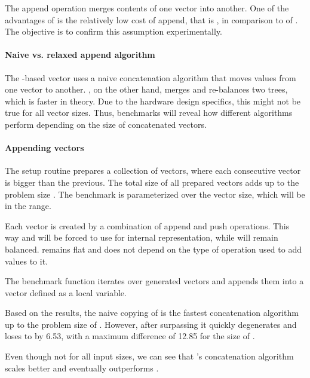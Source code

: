 The append operation merges contents of one vector into another. One of the advantages of \rrbtree{} is the relatively low cost of append, that is , in comparison to  of \stdvec{}. The objective is to confirm this assumption experimentally.

\paragraph{Naive vs. relaxed append algorithm}
The \rbtree{}-based vector uses a naive concatenation algorithm that moves values from one vector to another. \rrbtree{}, on the other hand, merges and re-balances two trees, which is faster in theory. Due to the hardware design specifics, this might not be true for all vector sizes. Thus, benchmarks will reveal how different algorithms perform depending on the size of concatenated vectors.

\paragraph{Appending vectors}
The setup routine prepares a collection of vectors, where each consecutive vector is bigger than the previous. The total size of all prepared vectors adds up to the problem size \n{}. The benchmark is parameterized over the vector size, which will be in the \range{[20, \mega{1}]} range.

Each vector is created by a combination of append and push operations. This way \pvec{} and \rrbvec{} will be forced to use \rrbtree{} for internal representation, while \rbvec{} will remain balanced. \stdvec{} remains flat and does not depend on the type of operation used to add values to it.

The benchmark function iterates over generated vectors and appends them into a vector defined as a local variable.

Based on the results, the naive copying of \stdvec{} is the fastest concatenation algorithm up to the problem size of . However, after surpassing  it quickly degenerates and loses to \rrbvec{} by 6.53, with a maximum difference of 12.85 for the size of .

Even though not for all input sizes, we can see that \rrbvec{}'s concatenation algorithm scales better and eventually outperforms \stdvec{}.

